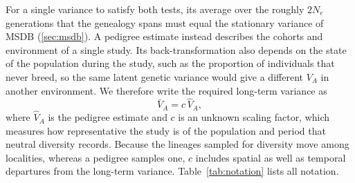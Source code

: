\documentclass{article}
\begin{document}
For a single variance to satisfy both tests, its average over the roughly $2N_e$ generations that the genealogy spans must equal the stationary variance of MSDB (\autoref{sec:msdb}). A pedigree estimate instead describes the cohorts and environment of a single study. Its back-transformation also depends on the state of the population during the study, such as the proportion of individuals that never breed, so the same latent genetic variance would give a different $V_A$ in another environment. We therefore write the required long-term variance as
\begin{equation}
    \bar{V}_A = c\,\hat{V}_A, \label{eq:c}
\end{equation}
where $\hat{V}_A$ is the pedigree estimate and $c$ is an unknown scaling factor, which measures how representative the study is of the population and period that neutral diversity records. Because the lineages sampled for diversity move among localities, whereas a pedigree samples one, $c$ includes spatial as well as temporal departures from the long-term variance. Table~\ref{tab:notation} lists all notation.
\end{document}
